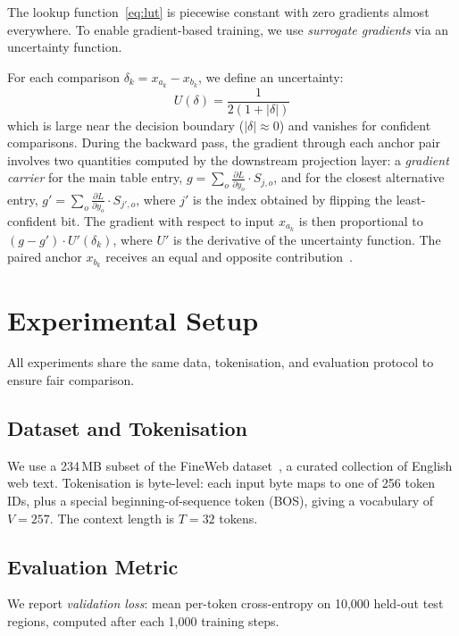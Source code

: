 \documentclass[11pt]{article}
\begin{document}
The lookup function~\eqref{eq:lut} is piecewise constant with zero gradients almost everywhere.
To enable gradient-based training, we use \emph{surrogate gradients} via an uncertainty function.

For each comparison $\delta_k = x_{a_k} - x_{b_k}$, we define an uncertainty:
\begin{equation}
    U(\delta) = \frac{1}{2(1 + |\delta|)}
    \label{eq:uncertainty}
\end{equation}
which is large near the decision boundary ($|\delta| \approx 0$) and vanishes for confident comparisons.
During the backward pass, the gradient through each anchor pair involves two quantities computed by the downstream projection layer: a \emph{gradient carrier} for the main table entry, $g = \sum_o \frac{\partial L}{\partial y_o} \cdot S_{j,o}$, and for the closest alternative entry, $g' = \sum_o \frac{\partial L}{\partial y_o} \cdot S_{j',o}$, where $j'$ is the index obtained by flipping the least-confident bit.
The gradient with respect to input $x_{a_k}$ is then proportional to $(g - g') \cdot U'(\delta_k)$, where $U'$ is the derivative of the uncertainty function.
The paired anchor $x_{b_k}$ receives an equal and opposite contribution~\cite{ref:manifesto}.


\section{Experimental Setup}
\label{sec:setup}

All experiments share the same data, tokenisation, and evaluation protocol to ensure fair comparison.

\subsection{Dataset and Tokenisation}

We use a 234\,MB subset of the FineWeb dataset~\cite{ref:fineweb}, a curated collection of English web text.
Tokenisation is byte-level: each input byte maps to one of 256 token IDs, plus a special beginning-of-sequence token (BOS), giving a vocabulary of $V = 257$.
The context length is $T = 32$ tokens.

\subsection{Evaluation Metric}

We report \emph{validation loss}: mean per-token cross-entropy on 10,000 held-out test regions, computed after each 1,000 training steps.
\end{document}
